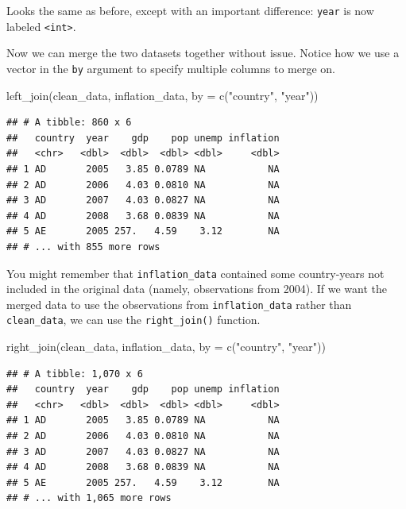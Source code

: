 \documentclass[
  12pt,
  oneside,openany]{book}
\newenvironment{Shaded}{\begin{snugshade}}{\end{snugshade}}
\newcommand{\AttributeTok}[1]{\textcolor[rgb]{0.77,0.63,0.00}{#1}}
\newcommand{\FunctionTok}[1]{\textcolor[rgb]{0.00,0.00,0.00}{#1}}
\newcommand{\NormalTok}[1]{#1}
\newcommand{\StringTok}[1]{\textcolor[rgb]{0.31,0.60,0.02}{#1}}
\begin{document}
Looks the same as before, except with an important difference: \texttt{year} is now labeled \texttt{\textless{}int\textgreater{}}.

Now we can merge the two datasets together without issue. Notice how we use a vector in the \texttt{by} argument to specify multiple columns to merge on.

\begin{Shaded}
\begin{Highlighting}[]
\FunctionTok{left\_join}\NormalTok{(clean\_data,}
\NormalTok{          inflation\_data,}
          \AttributeTok{by =} \FunctionTok{c}\NormalTok{(}\StringTok{"country"}\NormalTok{, }\StringTok{"year"}\NormalTok{))}
\end{Highlighting}
\end{Shaded}

\begin{verbatim}
## # A tibble: 860 x 6
##   country  year    gdp    pop unemp inflation
##   <chr>   <dbl>  <dbl>  <dbl> <dbl>     <dbl>
## 1 AD       2005   3.85 0.0789 NA           NA
## 2 AD       2006   4.03 0.0810 NA           NA
## 3 AD       2007   4.03 0.0827 NA           NA
## 4 AD       2008   3.68 0.0839 NA           NA
## 5 AE       2005 257.   4.59    3.12        NA
## # ... with 855 more rows
\end{verbatim}

You might remember that \texttt{inflation\_data} contained some country-years not included in the original data (namely, observations from 2004). If we want the merged data to use the observations from \texttt{inflation\_data} rather than \texttt{clean\_data}, we can use the \texttt{right\_join()} function.

\begin{Shaded}
\begin{Highlighting}[]
\FunctionTok{right\_join}\NormalTok{(clean\_data,}
\NormalTok{           inflation\_data,}
           \AttributeTok{by =} \FunctionTok{c}\NormalTok{(}\StringTok{"country"}\NormalTok{, }\StringTok{"year"}\NormalTok{))}
\end{Highlighting}
\end{Shaded}

\begin{verbatim}
## # A tibble: 1,070 x 6
##   country  year    gdp    pop unemp inflation
##   <chr>   <dbl>  <dbl>  <dbl> <dbl>     <dbl>
## 1 AD       2005   3.85 0.0789 NA           NA
## 2 AD       2006   4.03 0.0810 NA           NA
## 3 AD       2007   4.03 0.0827 NA           NA
## 4 AD       2008   3.68 0.0839 NA           NA
## 5 AE       2005 257.   4.59    3.12        NA
## # ... with 1,065 more rows
\end{verbatim}
\end{document}
